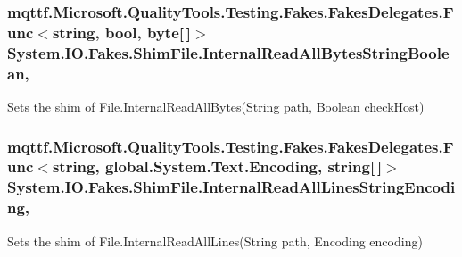 \hypertarget{class_system_1_1_i_o_1_1_fakes_1_1_shim_file_a93008e34b43da4540e4ce3469e0c81f4}{
\subsubsection[{Internal\-Read\-All\-Bytes\-String\-Boolean}]{\setlength{\rightskip}{0pt plus 5cm}mqttf.\-Microsoft.\-Quality\-Tools.\-Testing.\-Fakes.\-Fakes\-Delegates.\-Func$<$string, bool, byte\mbox{[}$\,$\mbox{]}$>$ System.\-I\-O.\-Fakes.\-Shim\-File.\-Internal\-Read\-All\-Bytes\-String\-Boolean\hspace{0.3cm}{\ttfamily [static]}, {\ttfamily [set]}}}\label{class_system_1_1_i_o_1_1_fakes_1_1_shim_file_a93008e34b43da4540e4ce3469e0c81f4}


Sets the shim of File.\-Internal\-Read\-All\-Bytes(\-String path, Boolean check\-Host)

\hypertarget{class_system_1_1_i_o_1_1_fakes_1_1_shim_file_a07b957f33a6e19ae474ede4f61b0eb7e}{
\subsubsection[{Internal\-Read\-All\-Lines\-String\-Encoding}]{\setlength{\rightskip}{0pt plus 5cm}mqttf.\-Microsoft.\-Quality\-Tools.\-Testing.\-Fakes.\-Fakes\-Delegates.\-Func$<$string, global.\-System.\-Text.\-Encoding, string\mbox{[}$\,$\mbox{]}$>$ System.\-I\-O.\-Fakes.\-Shim\-File.\-Internal\-Read\-All\-Lines\-String\-Encoding\hspace{0.3cm}{\ttfamily [static]}, {\ttfamily [set]}}}\label{class_system_1_1_i_o_1_1_fakes_1_1_shim_file_a07b957f33a6e19ae474ede4f61b0eb7e}


Sets the shim of File.\-Internal\-Read\-All\-Lines(\-String path, Encoding encoding)

